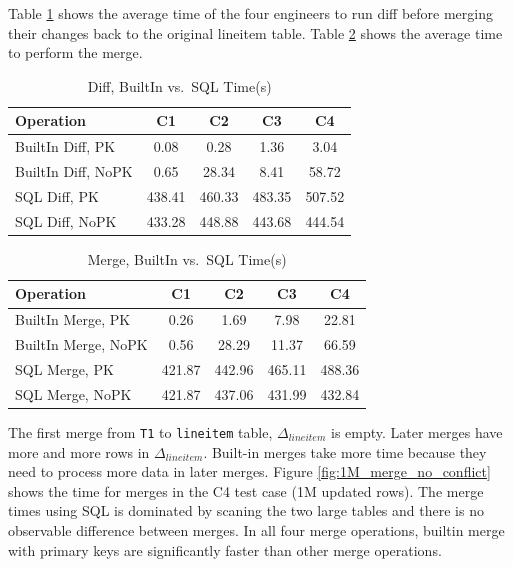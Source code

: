 \documentclass[sigconf,nonacm]{acmart} %
\begin{document}
Table \ref{tab:expdiff4} shows the average time of the four engineers 
to run diff before merging their changes back to the original 
lineitem table.  Table \ref{tab:expmerge4} shows the average 
time to perform the merge.

\begin{table}[h]
  \centering
  \caption{Diff, BuiltIn vs.\ SQL Time(s)}
  \label{tab:expdiff4}
  \begin{tabular}{lcccc}
    \toprule
    \textbf{Operation} & \textbf{C1} & \textbf{C2} & \textbf{C3} & \textbf{C4} \\
    \midrule
    BuiltIn Diff, PK  & 0.08 & 0.28 & 1.36 & 3.04 \\
    BuiltIn Diff, NoPK  & 0.65 & 28.34 & 8.41 & 58.72 \\
    SQL Diff, PK  & 438.41 & 460.33 & 483.35 & 507.52 \\
    SQL Diff, NoPK  & 433.28 & 448.88 & 443.68 & 444.54 \\
    \bottomrule
  \end{tabular}
\end{table}

\begin{table}[h]
  \centering
  \caption{Merge, BuiltIn vs.\ SQL Time(s)}
  \label{tab:expmerge4}
  \begin{tabular}{lcccc}
    \toprule
    \textbf{Operation} & \textbf{C1} & \textbf{C2} & \textbf{C3} & \textbf{C4} \\
    \midrule
    BuiltIn Merge, PK  & 0.26 & 1.69 & 7.98 & 22.81 \\
    BuiltIn Merge, NoPK  & 0.56 & 28.29 & 11.37 & 66.59 \\
    SQL Merge, PK  & 421.87 & 442.96 & 465.11 & 488.36 \\
    SQL Merge, NoPK  & 421.87 & 437.06 & 431.99 & 432.84 \\
    \bottomrule
  \end{tabular}
\end{table}

The first merge from \texttt{T1} to \texttt{lineitem} table, $\Delta_{lineitem}$ is empty. 
Later merges have more and more rows in $\Delta_{lineitem}$.  Built-in merges take more
time because they need to process more data in later merges.  Figure \ref{fig:1M_merge_no_conflict}
shows the time for merges in the C4 test case (1M updated rows).  The merge times using SQL is 
dominated by scaning the two large tables and there is no observable difference between
merges.  In all four merge operations, builtin merge with primary keys are significantly 
faster than other merge operations.
\end{document}
